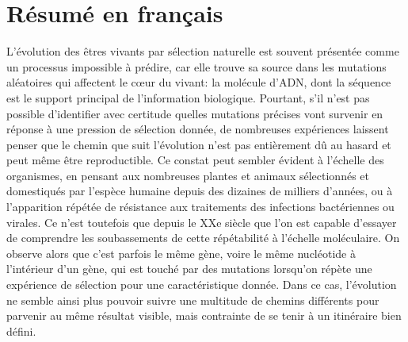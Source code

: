 
\chapter{Résumé en français}

L'évolution des êtres vivants par sélection naturelle est souvent présentée comme un processus impossible à prédire, car elle trouve sa source dans les mutations aléatoires qui affectent le cœur du vivant: la molécule d'ADN, dont la séquence est le support principal de l'information biologique.
Pourtant, s'il n'est pas possible d'identifier avec certitude quelles mutations précises vont survenir en réponse à une pression de sélection donnée, de nombreuses expériences laissent penser que le chemin que suit l'évolution n'est pas entièrement dû au hasard et peut même être reproductible.
Ce constat peut sembler évident à l'échelle des organismes, en pensant aux nombreuses plantes et animaux sélectionnés et domestiqués par l'espèce humaine depuis des dizaines de milliers d'années, ou à l'apparition répétée de résistance aux traitements des infections bactériennes ou virales.
Ce n'est toutefois que depuis le XXe siècle que l'on est capable d'essayer de comprendre les soubassements de cette répétabilité à l'échelle moléculaire.
On observe alors que c'est parfois le même gène, voire le même nucléotide à l'intérieur d'un gène, qui est touché par des mutations lorsqu'on répète une expérience de sélection pour une caractéristique donnée.
Dans ce cas, l'évolution ne semble ainsi plus pouvoir suivre une multitude de chemins différents pour parvenir au même résultat visible, mais contrainte de se tenir à un itinéraire bien défini.

